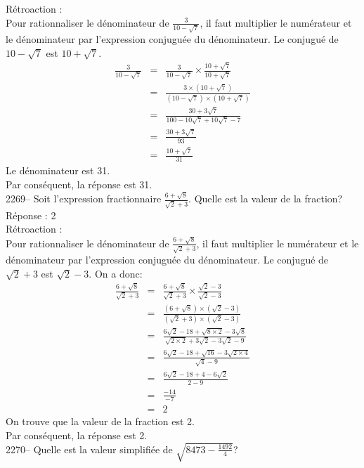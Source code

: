 \documentclass[letterpaper, 12pt]{article}
\begin{document}
R\'etroaction :\\
Pour rationnaliser le d\'enominateur de $\frac{3}{10-\sqrt{7}}$, il faut multiplier le num\'erateur et le d\'enominateur par l'expression conjugu\'ee du d\'enominateur. Le conjugu\'e de $10-\sqrt{7}$ est $10+\sqrt{7}$.
\begin{eqnarray*}
\frac{3}{10-\sqrt{7}}&=&\frac{3}{10-\sqrt{7}}\times\frac{10+\sqrt{7}}{10+\sqrt{7}}\\[2mm]
&=&\frac{3\times(10+\sqrt{7})}{(10-\sqrt{7})\times(10+\sqrt{7})}\\[2mm]
&=&\frac{30+3\sqrt{7}}{100-10\sqrt{7}+10\sqrt{7}-7}\\[2mm]
&=&\frac{30+3\sqrt{7}}{93}\\[2mm]
&=&\frac{10+\sqrt{7}}{31}
\end{eqnarray*}
Le d\'enominateur est 31.\\
Par cons\'equent, la r\'eponse est 31.\\

2269-- Soit l'expression fractionnaire $\frac{6+\sqrt{8}}{\sqrt{2}+3}$. Quelle est la valeur de la fraction?\\

R\'eponse : 2\\

R\'etroaction :\\
Pour rationnaliser le d\'enominateur de $\frac{6+\sqrt{8}}{\sqrt{2}+3}$, il faut multiplier le num\'erateur et le d\'enominateur par l'expression conjugu\'ee du d\'enominateur. Le conjugu\'e de $\sqrt{2}+3$ est $\sqrt{2}-3$. On a donc:
\begin{eqnarray*}
\frac{6+\sqrt{8}}{\sqrt{2}+3}&=&\frac{6+\sqrt{8}}{\sqrt{2}+3}\times\frac{\sqrt{2}-3}{\sqrt{2}-3}\\[2mm]
&=&\frac{(6+\sqrt{8})\times(\sqrt{2}-3)}{(\sqrt{2}+3)\times(\sqrt{2}-3)}\\[2mm]
&=&\frac{6\sqrt{2}-18+\sqrt{8\times2}-3\sqrt{8}}{\sqrt{2\times2}+3\sqrt{2}-3\sqrt{2}-9}\\[2mm]
&=&\frac{6\sqrt{2}-18+\sqrt{16}-3\sqrt{2\times4}}{\sqrt{4}-9}\\[2mm]
&=&\frac{6\sqrt{2}-18+4-6\sqrt{2}}{2-9}\\[2mm]
&=&\frac{-14}{-7}\\[2mm]
&=&2
\end{eqnarray*}
On trouve que la valeur de la fraction est 2.\\
Par cons\'equent, la r\'eponse est 2.\\

2270-- Quelle est la valeur simplifi\'ee de $\sqrt{8473-\frac{1492}{4}}$?\\
\end{document}
